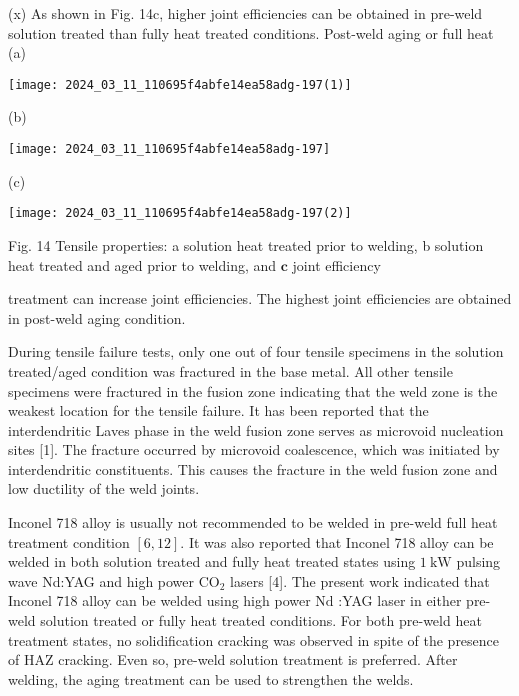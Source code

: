 \documentclass[10pt]{article}
\begin{document}
(x) As shown in Fig. 14c, higher joint efficiencies can be obtained in pre-weld solution treated than fully heat treated conditions. Post-weld aging or full heat\\
(a)

\begin{center}
\texttt{[image: 2024\_03\_11\_110695f4abfe14ea58adg-197(1)]}
\end{center}

(b)

\begin{center}
\texttt{[image: 2024\_03\_11\_110695f4abfe14ea58adg-197]}
\end{center}

(c)

\begin{center}
\texttt{[image: 2024\_03\_11\_110695f4abfe14ea58adg-197(2)]}
\end{center}

Fig. 14 Tensile properties: a solution heat treated prior to welding, b solution heat treated and aged prior to welding, and $\mathbf{c}$ joint efficiency

treatment can increase joint efficiencies. The highest joint efficiencies are obtained in post-weld aging condition.

During tensile failure tests, only one out of four tensile specimens in the solution treated/aged condition was fractured in the base metal. All other tensile specimens were fractured in the fusion zone indicating that the weld zone is the weakest location for the tensile failure. It has been reported that the interdendritic Laves phase in the weld fusion zone serves as microvoid nucleation sites [1]. The fracture occurred by microvoid coalescence, which was initiated by interdendritic constituents. This causes the fracture in the weld fusion zone and low ductility of the weld joints.

Inconel 718 alloy is usually not recommended to be welded in pre-weld full heat treatment condition $[6,12]$. It was also reported that Inconel 718 alloy can be welded in both solution treated and fully heat treated states using $1 \mathrm{~kW}$ pulsing wave Nd:YAG and high power $\mathrm{CO}_{2}$ lasers [4]. The present work indicated that Inconel 718 alloy can be welded using high power $\mathrm{Nd}$ :YAG laser in either pre-weld solution treated or fully heat treated conditions. For both pre-weld heat treatment states, no solidification cracking was observed in spite of the presence of HAZ cracking. Even so, pre-weld solution treatment is preferred. After welding, the aging treatment can be used to strengthen the welds.
\end{document}
